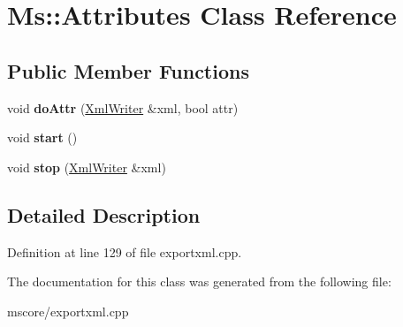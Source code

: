 \hypertarget{class_ms_1_1_attributes}{}\section{Ms\+:\+:Attributes Class Reference}
\label{class_ms_1_1_attributes}
\subsection*{Public Member Functions}
\begin{DoxyCompactItemize}
\item 
\mbox{\label{class_ms_1_1_attributes_a251059a15b69d045ed7253dca9b78f25}} 
void {\bfseries do\+Attr} (\hyperlink{class_ms_1_1_xml_writer}{Xml\+Writer} \&xml, bool attr)
\item 
\mbox{\label{class_ms_1_1_attributes_a7de7237f7a193b6b34a1c0ed12a836ba}} 
void {\bfseries start} ()
\item 
\mbox{\label{class_ms_1_1_attributes_aad93c0535b4221fc539958bc7f2d8606}} 
void {\bfseries stop} (\hyperlink{class_ms_1_1_xml_writer}{Xml\+Writer} \&xml)
\end{DoxyCompactItemize}


\subsection{Detailed Description}


Definition at line 129 of file exportxml.\+cpp.



The documentation for this class was generated from the following file\+:\begin{DoxyCompactItemize}
\item 
mscore/exportxml.\+cpp\end{DoxyCompactItemize}
